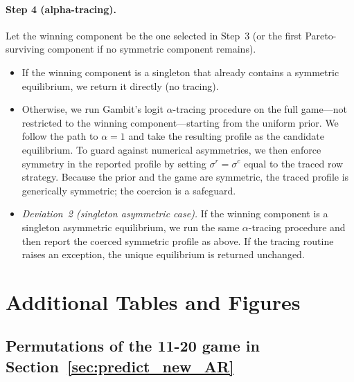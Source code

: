 \documentclass[11pt]{article}
\theoremstyle{definition}
\begin{document}
\paragraph{Step 4 (alpha-tracing).}
Let the winning component be the one selected in Step~3 (or the
first Pareto-surviving component if no symmetric component remains).
\begin{itemize}
\item If the winning component is a singleton that already contains a
symmetric equilibrium, we return it directly (no tracing).
\item Otherwise, we run Gambit's logit $\alpha$-tracing procedure on the full game---not restricted to the winning component---starting from the uniform prior. 
We follow the path to $\alpha=1$ and take the resulting profile as the candidate equilibrium. 
To guard against numerical asymmetries, we then enforce symmetry in the reported profile by setting $\sigma^{r}=\sigma^{c}$ equal to the traced row strategy.
Because the prior and the game are symmetric, the traced profile is generically symmetric; the coercion is a safeguard.
\item \emph{Deviation~2 (singleton asymmetric case).} If the winning
component is a singleton asymmetric equilibrium, we run the same
$\alpha$-tracing procedure and then report the coerced symmetric profile as above. 
If the tracing routine raises an exception, the unique equilibrium is returned unchanged.
\end{itemize}

\renewcommand{\thefigure}{D\arabic{figure}} 
\setcounter{figure}{0}  

\renewcommand{\thetable}{D\arabic{table}} 
\setcounter{table}{0}  

\section{Additional Tables and Figures}
\label{app:figs}

\subsection{Permutations of the 11-20 game in Section~\ref{sec:predict_new_AR}}
\end{document}
